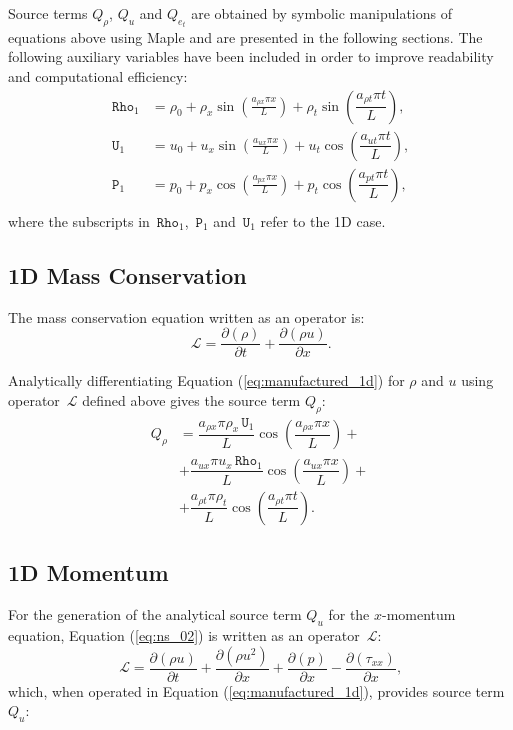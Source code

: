 \documentclass[10pt]{article}
\newcommand{\Diff}[2] {\dfrac{\partial( #1)}{\partial #2}}
\newcommand{\Rho}{\,\mathtt{Rho}}
\newcommand{\PP}{\,\mathtt{P}}
\newcommand{\U}{\,\mathtt{U}}
\newcommand{\Lo}{\,\mathcal{L}}
\begin{document}
Source terms $Q_\rho$, $Q_u$ and $Q_{e_t}$ are obtained by symbolic manipulations of equations above using Maple and are presented in the following sections. The following auxiliary variables have been included in order to improve readability and computational efficiency:
\begin{equation*}
 \begin{split}
\label{eq:aux_1d}
\Rho_1 &= \rho_{0}+ \rho_{x} \sin\left(\frac{a_{ \rho x} \pi x}{L}\right) + \rho_t \sin\left(\dfrac{a_{\rho t} \pi t}{L}\right),\\
\U_1 &= u_{0}+u_{x} \sin\left(\frac{a_{u x} \pi x}{L}\right) + u_t \cos\left(\dfrac{a_{u t} \pi t}{L}\right),\\
\PP_1 &= p_{0}+p_{x} \cos\left(\frac{a_{p x} \pi x}{L}\right)+ p_t \cos\left(\dfrac{a_{p t} \pi t}{L}\right),\\
\end{split}
\end{equation*}
where the subscripts in $\Rho_1$, $\PP_1$ and $\U_1$ refer to the 1D case.

\subsection{1D Mass Conservation}

The mass conservation equation written as an operator is:
\begin{equation*}
 \Lo=\Diff{\rho}{t} + \Diff{\rho u}{x}.
\end{equation*}

Analytically differentiating Equation (\ref{eq:manufactured_1d}) for $\rho$ and $u$  using operator $\Lo$ defined above gives  the source term $Q_{\rho}$:
\begin{equation}
 \begin{split}
Q_\rho &= \dfrac{a_{\rho x} \pi \rho_x \U_1}{L}\cos\left(\dfrac{a_{\rho x} \pi x}{L}\right) +\\
&+\dfrac{a_{ux} \pi u_x \Rho_1}{L}\cos\left(\dfrac{a_{ux} \pi x}{L}\right)+\\
&+\dfrac{a_{\rho t} \pi \rho_t }{L}\cos\left(\dfrac{a_{\rho t} \pi t}{L}\right) .
 \end{split}
\end{equation}


\subsection{1D Momentum}

For the generation of the analytical source term $Q_u$ for the $x$-momentum equation, Equation  (\ref{eq:ns_02}) is written as an  operator $\Lo$:
\begin{equation*}
 \Lo=\Diff{\rho u}{t} +\Diff{\rho u^2 }{x}+ \Diff{p}{x} -\Diff{\tau_{xx}}{x},
\end{equation*}
which, when operated in Equation (\ref{eq:manufactured_1d}), provides source term $Q_{u}$:
\end{document}
